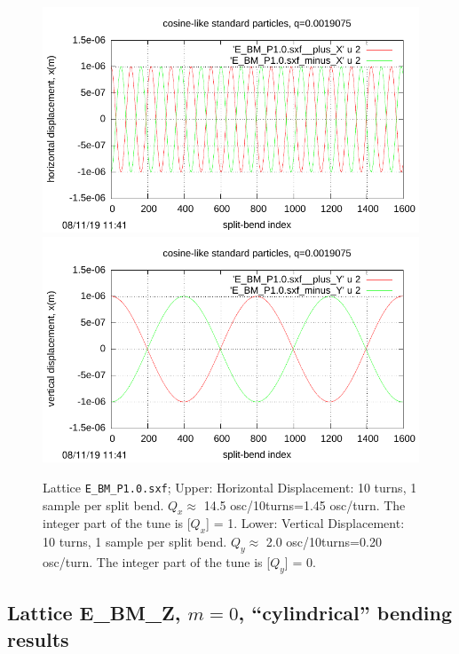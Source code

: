 \documentclass[12pt]{article}
\begin{document}
\begin{figure}[htbp]
  \includegraphics[scale=1.0]{pdf/Fig_I-2t.pdf}
  \includegraphics[scale=1.0]{pdf/Fig_I-2b.pdf} 
\caption{Lattice {\tt E\_BM\_P1.0.sxf}; Upper: Horizontal Displacement: 10 turns, 1 sample per split bend. 
$Q_x\approx$ 14.5 osc/10turns=1.45 osc/turn. The integer part of the tune is [$Q_x$] = 1. 
Lower: Vertical Displacement: 10 turns, 1 sample per split bend. $Q_y\approx$ 
2.0 osc/10turns=0.20 osc/turn. The integer part of the tune is [$Q_y$] = 0.}
\end{figure}

\clearpage

\subsection{Lattice E\_BM\_Z, $m=0$, ``cylindrical'' bending results}
\end{document}
